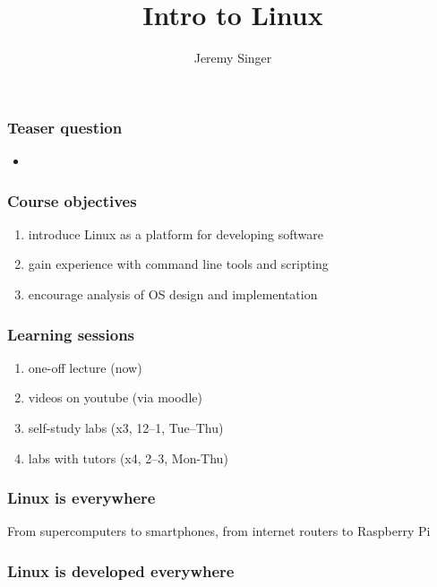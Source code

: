 \documentclass[17pt]{beamer}
\begin{document}
\title{Intro to Linux}
\author{Jeremy Singer}

\frame{\titlepage}

\begin{frame}
  \frametitle{Teaser question}
  \begin{itemize}
  \item {}
  \end{itemize}
\end{frame}


\begin{frame}
\frametitle{Course objectives}
\begin{enumerate}
\item introduce Linux as a platform for developing software
\item gain experience with command line tools and scripting
\item encourage analysis of OS design and implementation
\end{enumerate}
\end{frame}

\begin{frame}
\frametitle{Learning sessions}
\begin{enumerate}
\item one-off lecture (now)
\item videos on youtube (via moodle)
\item self-study labs (x3, 12--1, Tue--Thu)
\item labs with tutors (x4, 2--3, Mon-Thu)
\end{enumerate}
\end{frame}


\begin{frame}
\frametitle{Linux is everywhere}

From supercomputers to smartphones, from internet routers to Raspberry Pi
\end{frame}


\begin{frame}
\frametitle{Linux is developed everywhere}



\end{frame}
\end{document}
